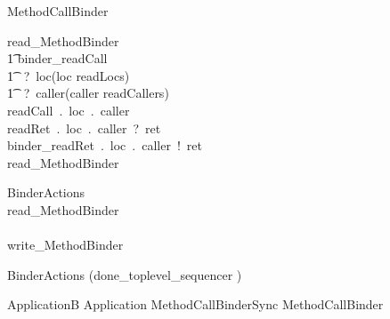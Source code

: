 

\begin{circus}
\circprocess  MethodCallBinder \circdef \circbegin \\
\end{circus}
%
%
\begin{circusaction}
read\_MethodBinder \circdef \\
	\t1 \circblockopen
	binder\_readCall\\ \t1 ~?~loc\prefixcolon(loc \in readLocs)\\ \t1 ~?~caller\prefixcolon(caller \in readCallers)  \then \\
	readCall~.~loc~.~caller  \then \\
	readRet~.~loc~.~caller~?~ret \then \\
	binder\_readRet~.~loc~.~caller~!~ret  \then \\
	read\_MethodBinder
	\circblockclose
\end{circusaction}
%
%
%
%
\begin{circus}
BinderActions \circdef \\
\circblockopen 
	read\_MethodBinder
	\\ \interleave \\

	write\_MethodBinder
	
\circblockclose
\end{circus}
%
\begin{circus}
\circspot BinderActions \circinterrupt (done\_toplevel\_sequencer \then \Skip)
\end{circus}
%
\begin{circus}
\circend
\end{circus}
%
\begin{circus}
\circprocess ApplicationB \circdef Application \lpar MethodCallBinderSync \rpar MethodCallBinder
\end{circus}
